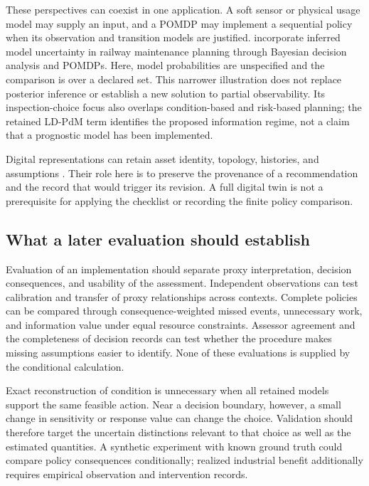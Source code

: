 \documentclass[symmetry,article,submit,pdftex,oneauthor]{Definitions/mdpi}
\begin{document}
These perspectives can coexist in one application. A soft sensor or physical usage model may supply an input, and a POMDP may implement a sequential policy when its observation and transition models are justified. \citet{Arcieri2023RobustMaintenance} incorporate inferred model uncertainty in railway maintenance planning through Bayesian decision analysis and POMDPs. Here, model probabilities are unspecified and the comparison is over a declared set. This narrower illustration does not replace posterior inference or establish a new solution to partial observability. Its inspection-choice focus also overlaps condition-based and risk-based planning; the retained LD-PdM term identifies the proposed information regime, not a claim that a prognostic model has been implemented.

Digital representations can retain asset identity, topology, histories, and assumptions \citep{vanDinter2022,Mahmoodian2022,Yu2021}. Their role here is to preserve the provenance of a recommendation and the record that would trigger its revision. A full digital twin is not a prerequisite for applying the checklist or recording the finite policy comparison.

\subsection{What a later evaluation should establish}

Evaluation of an implementation should separate proxy interpretation, decision consequences, and usability of the assessment. Independent observations can test calibration and transfer of proxy relationships across contexts. Complete policies can be compared through consequence-weighted missed events, unnecessary work, and information value under equal resource constraints. Assessor agreement and the completeness of decision records can test whether the procedure makes missing assumptions easier to identify. None of these evaluations is supplied by the conditional calculation.

Exact reconstruction of condition is unnecessary when all retained models support the same feasible action. Near a decision boundary, however, a small change in sensitivity or response value can change the choice. Validation should therefore target the uncertain distinctions relevant to that choice as well as the estimated quantities. A synthetic experiment with known ground truth could compare policy consequences conditionally; realized industrial benefit additionally requires empirical observation and intervention records.
\end{document}
